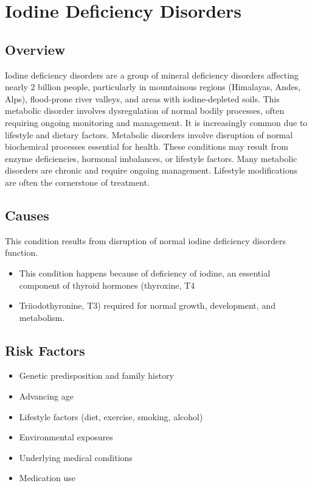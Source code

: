 \chapter{Iodine Deficiency Disorders}
\label{sec:Iodine Deficiency Disorders}

\section{Overview}
Iodine deficiency disorders are a group of mineral deficiency disorders affecting nearly 2 billion people, particularly in mountainous regions (Himalayas, Andes, Alps), flood-prone river valleys, and areas with iodine-depleted soils. This metabolic disorder involves dysregulation of normal bodily processes, often requiring ongoing monitoring and management. It is increasingly common due to lifestyle and dietary factors. Metabolic disorders involve disruption of normal biochemical processes essential for health. These conditions may result from enzyme deficiencies, hormonal imbalances, or lifestyle factors. Many metabolic disorders are chronic and require ongoing management. Lifestyle modifications are often the cornerstone of treatment.
\section{Causes}
This condition results from disruption of normal iodine deficiency disorders function.

\begin{itemize}[noitemsep]
  \item This condition happens because of deficiency of iodine, an essential component of thyroid hormones (thyroxine, T4
  \item Triiodothyronine, T3) required for normal growth, development, and metabolism.
\end{itemize}
\section{Risk Factors}
\begin{itemize}[noitemsep]
  \item Genetic predisposition and family history
  \item Advancing age
  \item Lifestyle factors (diet, exercise, smoking, alcohol)
  \item Environmental exposures
  \item Underlying medical conditions
  \item Medication use
\end{itemize}
